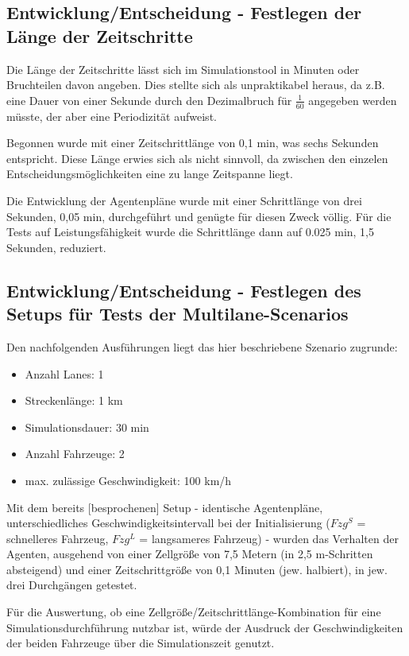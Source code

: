\subsection{Entwicklung/Entscheidung - Festlegen der Länge der Zeitschritte}

Die Länge der Zeitschritte lässt sich im Simulationstool in Minuten oder Bruchteilen davon angeben. Dies stellte sich als unpraktikabel heraus, da z.B. eine Dauer von einer Sekunde durch den Dezimalbruch für $\frac{1}{60}$ angegeben werden müsste, der aber eine Periodizität aufweist.

Begonnen wurde mit einer Zeitschrittlänge von 0,1 min, was sechs Sekunden entspricht. 
Diese Länge erwies sich als nicht sinnvoll, da zwischen den einzelen Entscheidungsmöglichkeiten eine zu lange Zeitspanne liegt.

Die Entwicklung der Agentenpläne wurde mit einer Schrittlänge von  drei Sekunden, 0,05 min, durchgeführt und genügte für diesen Zweck völlig.
Für die Tests auf Leistungsfähigkeit wurde die Schrittlänge dann auf 0.025 min, 1,5 Sekunden, reduziert.



\subsection{Entwicklung/Entscheidung - Festlegen des Setups für Tests der Multilane-Scenarios}

Den nachfolgenden Ausführungen liegt das hier beschriebene Szenario zugrunde:
\begin{itemize}
	\item Anzahl Lanes: 1
	\item Streckenlänge: 1 km
	\item Simulationsdauer: 30 min
	\item Anzahl Fahrzeuge: 2
	\item max. zulässige Geschwindigkeit: 100 km/h
\end{itemize}
Mit dem bereits [besprochenen] Setup - identische Agentenpläne, unterschiedliches Geschwindigkeitsintervall bei der Initialisierung ($Fzg^{S}$ = schnelleres Fahrzeug, $Fzg^{L}$ = langsameres Fahrzeug) - wurden das Verhalten der Agenten, ausgehend von einer Zellgröße von 7,5 Metern (in 2,5 m-Schritten absteigend) und einer Zeitschrittgröße von 0,1 Minuten (jew. halbiert), in jew. drei Durchgängen getestet.

Für die Auswertung, ob eine Zellgröße/Zeitschrittlänge-Kombination für eine Simulationsdurchführung nutzbar ist, würde der Ausdruck der Geschwindigkeiten der beiden Fahrzeuge über die Simulationszeit genutzt.

